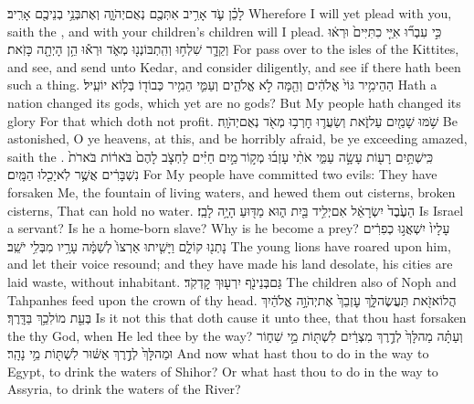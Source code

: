 {לָכֵ֗ן עֹ֛ד אָרִ֥יב אִתְּכֶ֖ם נְאֻם\maqqaf יְהֹוָ֑ה וְאֶת\maqqaf בְּנֵ֥י בְנֵיכֶ֖ם אָרִֽיב׃}
{Wherefore I will yet plead with you, saith the \lord, and with your children’s children will I plead.}
{כִּ֣י עִבְר֞וּ אִיֵּ֤י כִתִּיִּים֙ וּרְא֔וּ וְקֵדָ֛ר שִׁלְח֥וּ וְהִֽתְבּוֹנְנ֖וּ מְאֹ֑ד וּרְא֕וּ הֵ֥ן הָיְתָ֖ה כָּזֹֽאת׃}
{For pass over to the isles of the Kittites, and see, and send unto Kedar, and consider diligently, and see if there hath been such a thing.}
{הַהֵימִ֥יר גּוֹי֙ אֱלֹהִ֔ים וְהֵ֖מָּה לֹ֣א אֱלֹהִ֑ים וְעַמִּ֛י הֵמִ֥יר כְּבוֹד֖וֹ בְּל֥וֹא יוֹעִֽיל׃}
{Hath a nation changed its gods, which yet are no gods? But My people hath changed its glory For that which doth not profit.}
{שֹׁ֥מּוּ שָׁמַ֖יִם עַל\maqqaf זֹ֑את וְשַׂעֲר֛וּ חׇרְב֥וּ מְאֹ֖ד נְאֻם\maqqaf יְהֹוָֽה׃}
{Be astonished, O ye heavens, at this, and be horribly afraid, be ye exceeding amazed, saith the \lord.}
{כִּֽי\maqqaf שְׁתַּ֥יִם רָע֖וֹת עָשָׂ֣ה עַמִּ֑י אֹתִ֨י עָזְב֜וּ מְק֣וֹר \legarmeh  מַ֣יִם חַיִּ֗ים לַחְצֹ֤ב לָהֶם֙ בֹּאר֔וֹת בֹּארֹת֙ נִשְׁבָּרִ֔ים אֲשֶׁ֥ר לֹֽא\maqqaf יָכִ֖לוּ הַמָּֽיִם׃}
{For My people have committed two evils: They have forsaken Me, the fountain of living waters, and hewed them out cisterns, broken cisterns, That can hold no water.}
{הַעֶ֙בֶד֙ יִשְׂרָאֵ֔ל אִם\maqqaf יְלִ֥יד בַּ֖יִת ה֑וּא מַדּ֖וּעַ הָיָ֥ה לָבַֽז׃}
{Is Israel a servant? Is he a home-born slave? Why is he become a prey?}
{עָלָיו֙ יִשְׁאֲג֣וּ כְפִרִ֔ים נָתְנ֖וּ קוֹלָ֑ם וַיָּשִׁ֤יתוּ אַרְצוֹ֙ לְשַׁמָּ֔ה עָרָ֥יו  מִבְּלִ֥י יֹשֵֽׁב׃}
{The young lions have roared upon him, and let their voice resound; and they have made his land desolate, his cities are laid waste, without inhabitant.}
{גַּם\maqqaf בְּנֵי\maqqaf נֹ֖ף  יִרְע֖וּךְ קׇדְקֹֽד׃}
{The children also of Noph and Tahpanhes feed upon the crown of thy head.}
{הֲלוֹא\maqqaf זֹ֖את תַּעֲשֶׂה\maqqaf לָּ֑ךְ עׇזְבֵךְ֙ אֶת\maqqaf יְהֹוָ֣ה אֱלֹהַ֔יִךְ בְּעֵ֖ת מוֹלִכֵ֥ךְ בַּדָּֽרֶךְ׃}
{Is it not this that doth cause it unto thee, that thou hast forsaken the \lord\space thy God, when He led thee by the way?}
{וְעַתָּ֗ה מַה\maqqaf לָּךְ֙ לְדֶ֣רֶךְ מִצְרַ֔יִם לִשְׁתּ֖וֹת מֵ֣י שִׁח֑וֹר וּמַה\maqqaf לָּךְ֙ לְדֶ֣רֶךְ אַשּׁ֔וּר לִשְׁתּ֖וֹת מֵ֥י נָהָֽר׃}
{And now what hast thou to do in the way to Egypt, to drink the waters of Shihor? Or what hast thou to do in the way to Assyria, to drink the waters of the River?}
